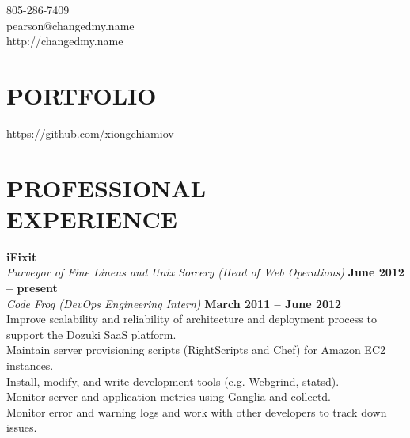 \documentclass[margin,line]{resume}
\begin{document}
{
    \sc
    \hfill 805-286-7409                   \vspace{0mm}\\\vspace{0mm}%
    \hfill pearson@changedmy.name         \vspace{0mm}\\\vspace{0mm}%
    \hfill http://changedmy.name          \vspace{0mm}\\\vspace{-9mm}%
}

\begin{resume}

\vspace{6mm}

    \section{\mysidestyle \textbf{\large{P}\small{ORTFOLIO}}}

    https://github.com/xiongchiamiov

\sectionline

    \section{\mysidestyle \textbf{\large{P}\small{ROFESSIONAL\\EXPERIENCE}}}

    \textbf{\listing iFixit} \vspace{2mm}\\\vspace{1mm}%
    \textsl{Purveyor of Fine Linens and Unix Sorcery (Head of Web Operations)} \hfill \textbf{June 2012 -- present}\\
    \textsl{Code Frog (DevOps Engineering Intern)} \hfill \textbf{March 2011 -- June 2012}\\
    Improve scalability and reliability of architecture and deployment process to support the Dozuki SaaS platform.\\
    Maintain server provisioning scripts (RightScripts and Chef) for Amazon EC2 instances.\\
    Install, modify, and write development tools (e.g. Webgrind, statsd).\\
    Monitor server and application metrics using Ganglia and collectd.\\
    Monitor error and warning logs and work with other developers to track down issues.


\end{resume}
\end{document}

